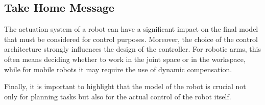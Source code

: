 \hfill

\subsection*{Take Home Message}

The actuation system of a robot can have a significant impact on the final model that must be considered for control purposes.  
Moreover, the choice of the control architecture strongly influences the design of the controller. For robotic arms, this often means deciding whether to work in the joint space or in the workspace, while for mobile robots it may require the use of dynamic compensation.  

Finally, it is important to highlight that the model of the robot is crucial not only for planning tasks but also for the actual control of the robot itself.
